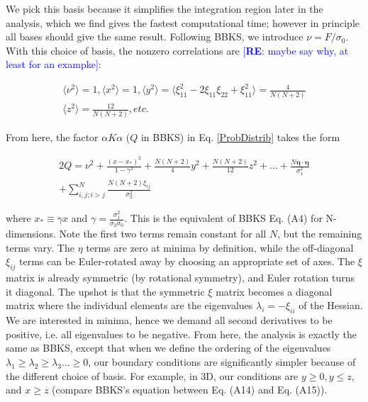 \documentclass[12pt]{article}
\newcommand{\re}[1]{\textcolor{blue}{[{\bf RE}: #1]}}
\begin{document}
We pick this basis because it simplifies the integration region later in the analysis, which we find gives the fastest computational time; however in principle all bases should give the same result. Following BBKS, we introduce $\nu = F/\sigma_0$. With this choice of basis, the nonzero correlations are \re{maybe say why, at least for an exampke}:

\begin{gather}
\langle\nu^2\rangle = 1, \langle x^2\rangle=1, \langle y^2 \rangle = \langle \xi_{11}^2 -2\xi_{11}\xi_{22} + \xi_{11}^2\rangle = \frac{4}{N(N+2)} \\
\langle z^2 \rangle = \frac{12}{N(N+2)}, etc.
\end{gather}

From here, the factor $\alpha K \alpha$ ($Q$ in BBKS) in Eq. \ref{ProbDistrib} takes the form

\begin{equation} \label{Q}
\begin{split}
2Q = \nu^2 + \frac{(x-x_*)^2}{1-\gamma^2} + \frac{N(N+2)}{4}y^2 + \frac{N(N+2)}{12}z^2 + \ldots + \frac{N \pmb{\eta}\cdot \pmb{\eta}}{\sigma_1^2} \\
+ \sum_{i,j;i > j}^N\frac{N(N+2)\xi_{ij}}{\sigma_2^2}
\end{split}
\end{equation}

\noindent where $x_* \equiv \gamma x$ and $\gamma = \frac{\sigma_1^2}{\sigma_2 \sigma_0}$. This is the equivalent of BBKS Eq. (A4) for N-dimensions. Note the first two terms remain constant for all $N$, but the remaining terms vary. The $\eta$ terms are zero at minima by definition, while the off-diagonal $\xi_{ij}$ terms can be Euler-rotated away by choosing an appropriate set of axes. The $\xi$ matrix is already symmetric (by rotational symmetry), and Euler rotation turns it diagonal.\cite{Goldstein} The upshot is that the symmetric $\xi$ matrix becomes a diagonal matrix where the individual elements are the eigenvalues $\lambda_i = -\xi_{ii}$ of the Hessian. We are interested in minima, hence we demand all second derivatives to be positive, i.e. all eigenvalues to be negative. From here, the analysis is exactly the same as BBKS, except that when we define the ordering of the eigenvalues $\lambda_1 \geq \lambda_2 \geq \lambda_3 \ldots \geq 0$, our boundary conditions are significantly simpler because of the different choice of basis. For example, in 3D, our conditions are $y \geq 0, y \leq z$, and $x \geq z$ (compare BBKS's equation between Eq. (A14) and Eq. (A15)).
\end{document}
